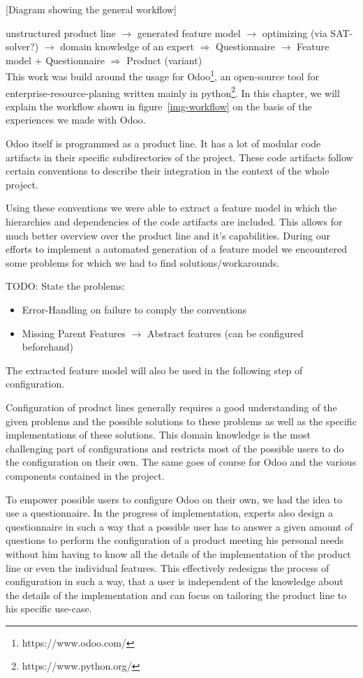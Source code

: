 [Diagram showing the general workflow]

unstructured product line $\rightarrow$ generated feature model $\rightarrow$ optimizing (via SAT-solver?) $\rightarrow$ domain knowledge of an expert $\Rightarrow$ Questionnaire $\rightarrow$ Feature model + Questionnaire $\Rightarrow$ Product (variant)\\

This work was build around the usage for Odoo\footnote{https://www.odoo.com/}, an open-source tool for enterprise-resource-planing written mainly in python\footnote{https://www.python.org/}. In this chapter, we will explain the workflow shown in figure~\ref{img-workflow} on the basis of the experiences we made with Odoo.

Odoo itself is programmed as a product line. It has a lot of modular code artifacts in their specific subdirectories of the project. These code artifacts follow certain conventions to describe their integration in the context of the whole project.

Using these conventions we were able to extract a feature model in which the hierarchies and dependencies of the code artifacts are included. This allows for much better overview over the product line and it's capabilities. During our efforts to implement a automated generation of a feature model we encountered some problems for which we had to find solutions/workarounds.

{\color{red}TODO: State the problems:
\begin{itemize}
\item Error-Handling on failure to comply the conventions
\item Missing Parent Features $\rightarrow$ Abstract features (can be configured beforehand)
\end{itemize}}

The extracted feature model will also be used in the following step of configuration.

Configuration of product lines generally requires a good understanding of the given problems and the possible solutions to these problems as well as the specific implementations of these solutions. This domain knowledge is the most challenging part of configurations and restricts most of the possible users to do the configuration on their own. The same goes of course for Odoo and the various components contained in the project.

To empower possible users to configure Odoo on their own, we had the idea to use a questionnaire. In the progress of implementation, experts also design a questionnaire in such a way that a possible user has to answer a given amount of questions to perform the configuration of a product meeting his personal needs without him having to know all the details of the implementation of the product line or even the individual features. This effectively redesigns the process of configuration in such a way, that a user is independent of the knowledge about the details of the implementation and can focus on tailoring the product line to his specific use-case.

